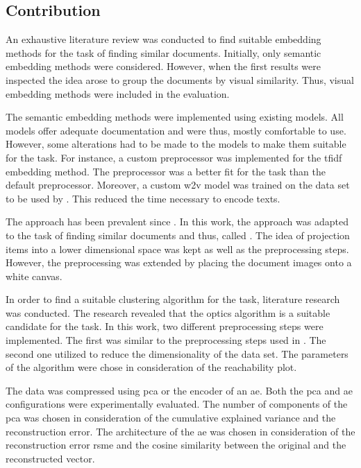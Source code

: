 \subsection{Contribution}\label{subsec:contribution}
An exhaustive literature review was conducted to find suitable embedding methods for the task of finding similar documents.
Initially, only semantic embedding methods were considered.
However, when the first results were inspected the idea arose to group the documents by visual similarity.
Thus, visual embedding methods were included in the evaluation.

The semantic embedding methods were implemented using existing models.
All models offer adequate documentation and were thus, mostly comfortable to use.
However, some alterations had to be made to the models to make them suitable for the task.
For instance, a custom preprocessor was implemented for the \ac{tfidf} embedding method.
The preprocessor was a better fit for the task than the default preprocessor.
Moreover, a custom \ac{w2v} model was trained on the data set to be used by \infersent{}.
This reduced the time necessary to encode texts.

The \eigenfaces{} approach has been prevalent since \citeyear{eigenfaces1991}.
In this work, the approach was adapted to the task of finding similar documents and thus, called \eigendocs{}.
The idea of projection items into a lower dimensional space was kept as well as the preprocessing steps.
However, the preprocessing was extended by placing the document images onto a white canvas.


In order to find a suitable clustering algorithm for the task, literature research was conducted.
The research revealed that the \ac{optics} algorithm is a suitable candidate for the task.
In this work, two different preprocessing steps were implemented.
The first was similar to the preprocessing steps used in \cite{OPTICS1999}.
The second one utilized \eigendocs{} to reduce the dimensionality of the data set.
The parameters of the algorithm were chose in consideration of the reachability plot.


The data was compressed using \ac{pca} or the encoder of an \ac{ae}.
Both the \ac{pca} and \ac{ae} configurations were experimentally evaluated.
The number of components of the \ac{pca} was chosen in consideration of the cumulative explained variance 
and the reconstruction error.
The architecture of the \ac{ae} was chosen in consideration of the reconstruction error \ac{rsme} and 
the cosine similarity between the original and the reconstructed vector.


